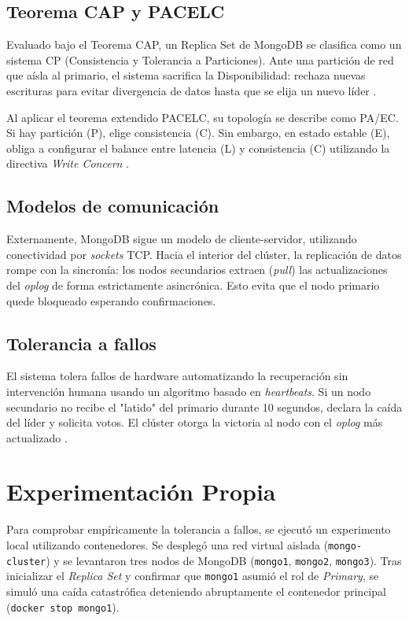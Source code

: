 \documentclass[12pt,a4paper]{article}
\begin{document}
\subsection{Teorema CAP y PACELC}
Evaluado bajo el Teorema CAP, un Replica Set de MongoDB se clasifica como un sistema CP (Consistencia y Tolerancia a Particiones). Ante una partición de red que aísla al primario, el sistema sacrifica la Disponibilidad: rechaza nuevas escrituras para evitar divergencia de datos hasta que se elija un nuevo líder \cite{schultz2025design}. 

Al aplicar el teorema extendido PACELC, su topología se describe como PA/EC. Si hay partición (P), elige consistencia (C). Sin embargo, en estado estable (E), obliga a configurar el balance entre latencia (L) y consistencia (C) utilizando la directiva \textit{Write Concern} \cite{ferreira2024impacts, ferreira2025benchmarking}. 

\subsection{Modelos de comunicación}
Externamente, MongoDB sigue un modelo de cliente-servidor, utilizando conectividad por \textit{sockets} TCP. Hacia el interior del clúster, la replicación de datos rompe con la sincronía: los nodos secundarios extraen (\textit{pull}) las actualizaciones del \textit{oplog} de forma estrictamente asincrónica. Esto evita que el nodo primario quede bloqueado esperando confirmaciones.

\subsection{Tolerancia a fallos}
El sistema tolera fallos de hardware automatizando la recuperación sin intervención humana usando un algoritmo basado en \textit{heartbeats}. Si un nodo secundario no recibe el "latido" del primario durante 10 segundos, declara la caída del líder y solicita votos. El clúster otorga la victoria al nodo con el \textit{oplog} más actualizado \cite{mongodb2026replica}.

\section{Experimentación Propia}
Para comprobar empíricamente la tolerancia a fallos, se ejecutó un experimento local utilizando contenedores. Se desplegó una red virtual aislada (\texttt{mongo-cluster}) y se levantaron tres nodos de MongoDB (\texttt{mongo1}, \texttt{mongo2}, \texttt{mongo3}). Tras inicializar el \textit{Replica Set} y confirmar que \texttt{mongo1} asumió el rol de \textit{Primary}, se simuló una caída catastrófica deteniendo abruptamente el contenedor principal (\texttt{docker stop mongo1}).
\end{document}
